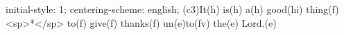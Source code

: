 initial-style: 1;
centering-scheme: english;
(c3)It(h) is(h) a(h) good(hi) thing(f) <sp>*</sp> to(f) give(f) thanks(f) un(e)to(fv) the(e) Lord.(e)
